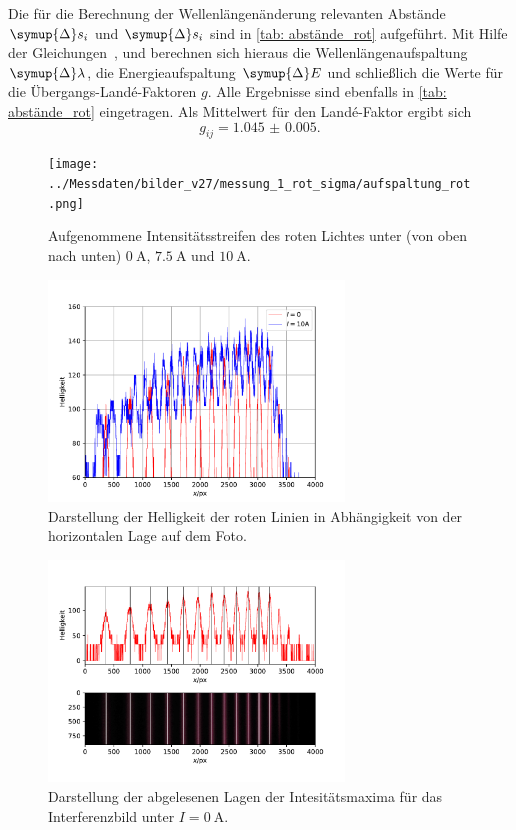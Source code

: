 Die für die Berechnung der Wellenlängenänderung relevanten Abstände $\symup{\Delta} s_i$ und $\symup{\Delta} s_i$ sind in \autoref{tab: abstände_rot}
aufgeführt. Mit Hilfe der Gleichungen~\label{eq: wellen_änderung}, \label{eq:energie_diff} und \label{eq: uebergangs_lande}
berechnen sich hieraus die Wellenlängenaufspaltung $\symup{\Delta} \lambda$, die
Energieaufspaltung $\symup{\Delta} E$ und schließlich die Werte für die Übergangs-Landé-Faktoren $g$. Alle Ergebnisse sind ebenfalls in
\autoref{tab: abstände_rot} eingetragen. Als Mittelwert für den Landé-Faktor ergibt sich
\begin{equation}
  g_{ij} = \num{1.045(5)}.
\end{equation}
\begin{figure}
  \centering
  \texttt{[image: ../Messdaten/bilder\_v27/messung\_1\_rot\_sigma/aufspaltung\_rot.png]}
  \caption{Aufgenommene Intensitätsstreifen des roten Lichtes unter (von oben nach unten) $\SI{0}{\ampere}$, $\SI{7.5}{\ampere}$ und $\SI{10}{\ampere}$.}
  \label{fig: aufspaltung_rot}
\end{figure}
\begin{figure}
  \centering
  \includegraphics[width = 0.7\textwidth]{../Messdaten/plots/rot_sigma_intensitaet.pdf}
  \caption{Darstellung der Helligkeit der roten Linien in Abhängigkeit von der horizontalen Lage auf dem Foto.}
  \label{fig: rot_intensität}
\end{figure}

\begin{figure}
  \centering
  \includegraphics[width = 0.7\textwidth]{../Messdaten/plots/peaks_rot_sigma_0.pdf}
  \caption{Darstellung der abgelesenen Lagen der Intesitätsmaxima für das Interferenzbild unter $I =\SI{0}{\ampere}$.}
  \label{fig: peaks_rot_0}
\end{figure}
